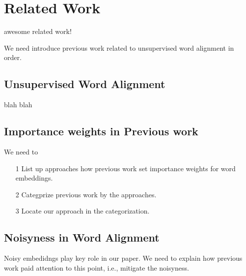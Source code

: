 \section{Related Work}
	awesome related work!

	We need introduce previous work related to unsupervised word alignment in order.

	\subsection{Unsupervised Word Alignment}
		blah blah

	\subsection{Importance weights in Previous work}
		We need to 
		\begin{itemize}
			\item[1] List up approaches how previous work set importance weights for word embeddings.
			\item[2] Categprize previous work by the approaches.
			\item[3] Locate our approach in the categorization.
		\end{itemize}

	\subsection{Noisyness in Word Alignment}
		Noisy embedidngs play key role in our paper.
		We need to explain how previous work paid attention to this point, i.e., mitigate the noisyness.
		


